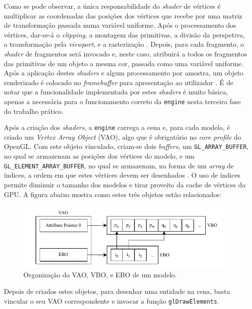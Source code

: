 \documentclass[12pt, a4paper]{article}
\begin{document}
Como se pode observar, a única responsabilidade do \emph{shader} de vértices é multiplicar as
coordenadas das posições dos vértices que recebe por uma matriz de transformação passada numa
variável uniforme. Após o processamento dos vértices, dar-se-á o \emph{clipping}, a montagem das
primitivas, a divisão da perspetiva, a transformação pela \emph{viewport}, e a rasterização
\cite{vertex-post-processing}. Depois, para cada fragmento, o \emph{shader} de fragmentos será
invocado e, neste caso, atribuirá a todos os fragmentos das primitivas de um objeto a mesma cor,
passada como uma variável uniforme. Após a aplicação destes \emph{shaders} e algum processamento por
amostra, um objeto renderizado é colocado no \emph{framebuffer} para apresentação ao utilizador
\cite{per-sample-processing}. É de notar que a funcionalidade implementada por estes \emph{shaders}
é muito básica, apenas a necessária para o funcionamento correto da \texttt{engine} nesta terceira
fase do trabalho prático.

Após a criação dos \emph{shaders}, a \texttt{engine} carrega a cena e, para cada modelo, é criado um
\emph{Vertex Array Object} (VAO), algo que é obrigatório no \emph{core profile} do OpenGL. Com este
objeto vinculado, criam-se dois \emph{buffers}, um \texttt{GL\_ARRAY\_BUFFER}, no qual se armazenam
as posições dos vértices do modelo, e um \texttt{GL\_ELEMENT\_ARRAY\_BUFFER}, no qual se armazenam,
na forma de um \emph{array} de índices, a ordem em que estes vértices devem ser desenhados
\cite{glBufferData}. O uso de índices permite diminuir o tamanho dos modelos e tirar proveito da
cache de vértices da GPU. A figura abaixo mostra como estes três objetos estão relacionados:

\begin{figure}[H]
    \centering
    \includegraphics[width=\textwidth]{res/phase3/VAO.pdf}
    \caption{Organização do VAO, VBO, e EBO de um modelo.}
\end{figure}

Depois de criados estes objetos, para desenhar uma entidade na cena, basta vincular o seu VAO
correspondente e invocar a função \texttt{glDrawElements}.
\end{document}
